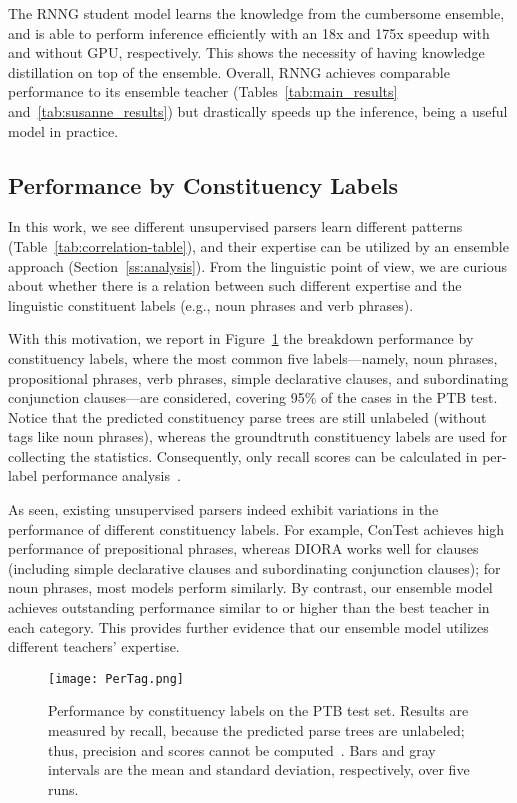 \documentclass{article}
\begin{document}
The RNNG student model learns the knowledge from the cumbersome ensemble, and is able to perform inference efficiently with an 18x and 175x speedup with and without GPU, respectively. This shows the necessity of having knowledge distillation on top of the ensemble. Overall, RNNG achieves comparable performance to its ensemble teacher (Tables~\ref{tab:main_results} and~\ref{tab:susanne_results}) but drastically speeds up the inference, being a useful model in practice.


\subsection{Performance by Constituency Labels}\label{app:breakdown}


In this work, we see different unsupervised parsers learn different patterns (Table~\ref{tab:correlation-table}), and their expertise can be utilized by an ensemble approach (Section~\ref{ss:analysis}). From the linguistic point of view, we are curious about whether there is a relation between such different expertise and the linguistic constituent labels (e.g., noun phrases and verb phrases). 

With this motivation, we report in Figure~\ref{fig:pertag} the breakdown performance by constituency labels, where the most common five labels---namely, noun phrases, propositional phrases, verb phrases, simple declarative clauses, and subordinating conjunction clauses---are considered, covering 95\% of the cases in the PTB test. Notice that the predicted constituency parse trees are still unlabeled (without tags like noun phrases), whereas the groundtruth constituency labels are used for collecting the statistics. Consequently, only recall scores can be calculated in per-label performance analysis~\citep{drozdov-etal-2019-unsupervised-latent,kim-etal-2019-compound,cao-etal-2020-unsupervised}. 

As seen, existing unsupervised parsers indeed exhibit variations in the performance of different constituency labels. For example, ConTest achieves high performance of prepositional phrases, whereas DIORA works well for clauses (including simple declarative clauses and subordinating conjunction clauses); for noun phrases, most models perform similarly. By contrast, our ensemble model achieves outstanding performance similar to or higher than the best teacher in each category. This provides further evidence that our ensemble model utilizes different teachers' expertise. 

\begin{figure}[t]
\begin{center}
\texttt{[image: PerTag.png]}
\end{center}\vspace{-10pt}
\caption{Performance by constituency labels on the PTB test set. Results are measured by recall, because the predicted parse trees are unlabeled; thus, precision and  scores cannot be computed~\citep{drozdov-etal-2019-unsupervised-latent}. Bars and gray intervals are the mean and standard deviation, respectively, over five runs.}
\label{fig:pertag}
\end{figure}
\end{document}
